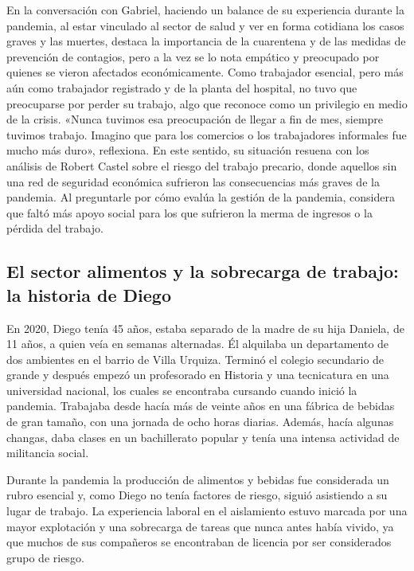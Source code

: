\begin{refsection}
En la conversación con Gabriel, haciendo un balance de su experiencia durante la pandemia, al estar vinculado al sector de salud y ver en forma cotidiana los casos graves y las muertes, destaca la importancia de la cuarentena y de las medidas de prevención de contagios, pero a la vez se lo nota empático y preocupado por quienes se vieron afectados económicamente. Como trabajador esencial, pero más aún como trabajador registrado y de la planta del hospital, no tuvo que preocuparse por perder su trabajo, algo que reconoce como un privilegio en medio de la crisis. «Nunca tuvimos esa preocupación de llegar a fin de mes, siempre tuvimos trabajo. Imagino que para los comercios o los trabajadores informales fue mucho más duro», reflexiona. En este sentido, su situación resuena con los análisis de Robert Castel sobre el riesgo del trabajo precario, donde aquellos sin una red de seguridad económica sufrieron las consecuencias más graves de la pandemia. Al preguntarle por cómo evalúa la gestión de la pandemia, considera que faltó más apoyo social para los que sufrieron la merma de ingresos o la pérdida del trabajo.


\subsection[El sector alimentos y la sobrecarga de trabajo: la historia de Diego]{El sector alimentos y la sobrecarga de trabajo: la historia de Diego}
\label{cap-29.el-sector-alimentos-y-la-sobrecarga-de-trabajo-la-historia-de-diego}
En 2020, Diego tenía 45 años, estaba separado de la madre de su hija Daniela, de 11 años, a quien veía en semanas alternadas. Él alquilaba un departamento de dos ambientes en el barrio de Villa Urquiza. Terminó el colegio secundario de grande y después empezó un profesorado en Historia y una tecnicatura en una universidad nacional, los cuales se encontraba cursando cuando inició la pandemia. Trabajaba desde hacía más de veinte años en una fábrica de bebidas de gran tamaño, con una jornada de ocho horas diarias. Además, hacía algunas changas, daba clases en un bachillerato popular y tenía una intensa actividad de militancia social.

Durante la pandemia la producción de alimentos y bebidas fue considerada un rubro esencial y, como Diego no tenía factores de riesgo, siguió asistiendo a su lugar de trabajo. La experiencia laboral en el aislamiento estuvo marcada por una mayor explotación y una sobrecarga de tareas que nunca antes había vivido, ya que muchos de sus compañeros se encontraban de licencia por ser considerados grupo de riesgo.



\end{refsection}
